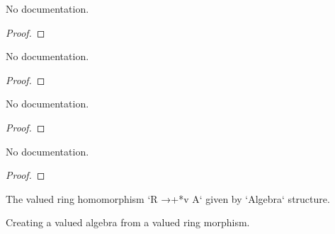 \begin{theorem}\label{ValAlgEquiv.symm_trans_self}
        \leanok
                No documentation.
    \end{theorem}

\begin{proof}
    \leanok
\end{proof}

\begin{theorem}\label{ValAlgEquiv.self_symm_trans}
        \leanok
                No documentation.
    \end{theorem}

\begin{proof}
    \leanok
\end{proof}

\begin{theorem}\label{ValAlgEquiv.one_apply}
        \leanok
                No documentation.
    \end{theorem}

\begin{proof}
    \leanok
\end{proof}

\begin{theorem}\label{ValAlgEquiv.mul_apply}
        \leanok
                No documentation.
    \end{theorem}

\begin{proof}
    \leanok
\end{proof}

\begin{definition}\label{valAlgebraMap}
        \leanok
                The valued ring homomorphism `R →+*v A` given by `Algebra` structure.
    \end{definition}

\begin{definition}\label{ValRingHom.toValAlgebra'}
        \leanok
                Creating a valued algebra from a valued ring morphism.
    \end{definition}

